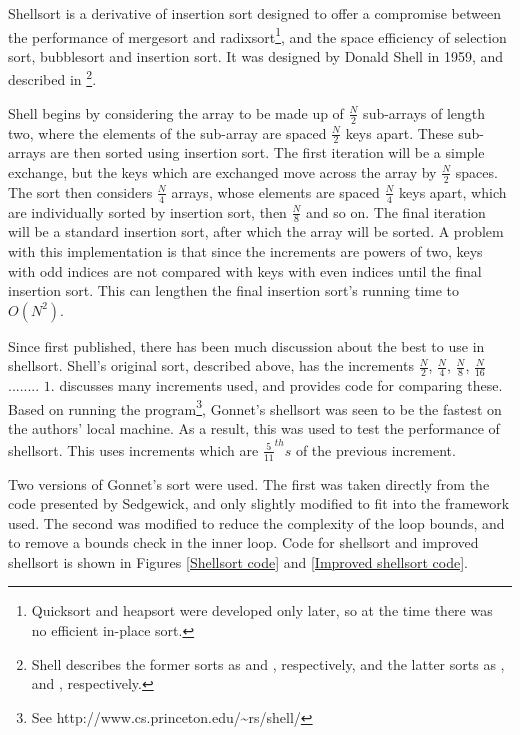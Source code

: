 \label{shell}

Shellsort is a derivative of insertion sort designed to offer a compromise
between the performance of mergesort and radixsort\footnote{Quicksort and
heapsort were developed only later, so at the time there was no efficient
in-place sort.}, and the space efficiency of selection sort, bubblesort and
insertion sort. It was designed by Donald Shell in 1959, and described in
\cite{Shell59}\footnote{Shell describes the former sorts as 
and , respectively, and the latter sorts as ,  and , respectively.}.

Shell begins by considering the array to be made up of $\frac{N}{2}$ sub-arrays
of length two, where the elements of the sub-array are spaced $\frac{N}{2}$ keys
apart. These sub-arrays are then sorted using insertion sort. The first
iteration will be a simple exchange, but the keys which are exchanged move
across the array by $\frac{N}{2}$ spaces. The sort then considers $\frac{N}{4}$
arrays, whose elements are spaced $\frac{N}{4}$ keys apart, which are
individually sorted by insertion sort, then $\frac{N}{8}$ and so on. The final
iteration will be a standard insertion sort, after which the array will be
sorted. A problem with this implementation is that since the increments are
powers of two, keys with odd indices are not compared with keys with even
indices until the final insertion sort. This can lengthen the final insertion
sort's running time to $O(N^2)$.

Since first published, there has been much discussion about the best
 to use in shellsort. Shell's original sort, described above,
has the increments $\frac{N}{2}$, $\frac{N}{4}$, $\frac{N}{8}$, $\frac{N}{16}$
........ $1$. \cite{Sedgewick96} discusses many increments used, and provides
code for comparing these. Based on running the  program\footnote{See
http://www.cs.princeton.edu/\textasciitilde{}rs/shell/}, Gonnet's shellsort was
seen to be the fastest on the authors' local machine. As a result, this was used
to test the performance of shellsort. This uses increments which are
$\frac{5}{11}^{th}s$ of the previous increment.

Two versions of Gonnet's sort were used. The first was taken directly from the
code presented by Sedgewick, and only slightly modified to fit into the
framework used. The second was modified to reduce the complexity of the loop
bounds, and to remove a bounds check in the inner loop. Code for shellsort and
improved shellsort is shown in Figures \ref{Shellsort code} and \ref{Improved
shellsort code}.

